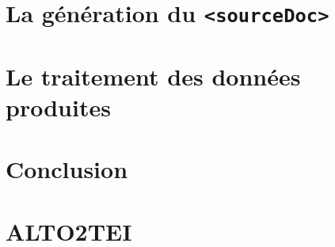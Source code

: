 \documentclass[a4paper,12pt,twoside]{book}
\begin{document}
	\chapter{La génération du \texttt{<sourceDoc>}}
	
	\label{chap.8}
	
	\chapter{Le traitement des données produites}
	
	\label{chap.9}
	
	\chapter*{Conclusion}
	
	
	
	\appendix
	\chapter{ALTO2TEI}
	
	
	\backmatter

	
	\printglossaries

	\listoffigures

	\listoftables

	\tableofcontents
	
\end{document}
